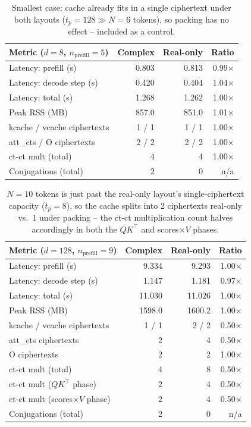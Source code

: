 \documentclass[11pt]{article}
\begin{document}
\begin{table}[H]
\centering
\small
\begin{tabular}{lrrr}
\toprule
Metric ($d{=}8$, $n_{\text{prefill}}{=}5$) & Complex & Real-only & Ratio \\
\midrule
Latency: prefill (s)     & 0.803   & 0.813   & 0.99$\times$ \\
Latency: decode step (s) & 0.420   & 0.404   & 1.04$\times$ \\
Latency: total (s)       & 1.268   & 1.262   & 1.00$\times$ \\
Peak RSS (MB)            & 857.0   & 851.0   & 1.01$\times$ \\
kcache / vcache ciphertexts & 1 / 1 & 1 / 1 & 1.00$\times$ \\
att\_cts / O ciphertexts    & 2 / 2 & 2 / 2 & 1.00$\times$ \\
ct-ct mult (total)       & 4       & 4       & 1.00$\times$ \\
Conjugations (total)     & 2       & 0       & n/a \\
\bottomrule
\end{tabular}
\caption{Smallest case: cache already fits in a single ciphertext under
both layouts ($t_p{=}128 \gg N{=}6$ tokens), so packing has no effect --
included as a control.}
\end{table}

\begin{table}[H]
\centering
\small
\begin{tabular}{lrrr}
\toprule
Metric ($d{=}128$, $n_{\text{prefill}}{=}9$) & Complex & Real-only & Ratio \\
\midrule
Latency: prefill (s)     & 9.334   & 9.293   & 1.00$\times$ \\
Latency: decode step (s) & 1.147   & 1.181   & 0.97$\times$ \\
Latency: total (s)       & 11.030  & 11.026  & 1.00$\times$ \\
Peak RSS (MB)            & 1598.0  & 1600.2  & 1.00$\times$ \\
kcache / vcache ciphertexts & 1 / 1 & 2 / 2 & 0.50$\times$ \\
att\_cts ciphertexts        & 2     & 4     & 0.50$\times$ \\
O ciphertexts               & 2     & 2     & 1.00$\times$ \\
ct-ct mult (total)       & 4       & 8       & 0.50$\times$ \\
ct-ct mult ($QK^\top$ phase)     & 2 & 4 & 0.50$\times$ \\
ct-ct mult (scores$\times V$ phase) & 2 & 4 & 0.50$\times$ \\
Conjugations (total)     & 2       & 0       & n/a \\
\bottomrule
\end{tabular}
\caption{$N=10$ tokens is just past the real-only layout's single-ciphertext
capacity ($t_p{=}8$), so the cache splits into 2 ciphertexts real-only vs.\
1 under packing -- the ct-ct multiplication count halves accordingly in
both the $QK^\top$ and scores$\times V$ phases.}
\end{table}
\end{document}
